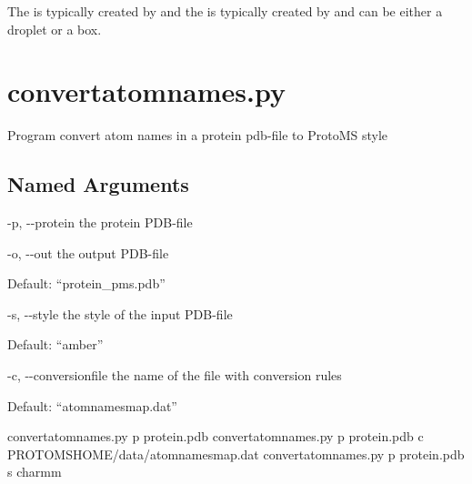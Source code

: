 \documentclass[letterpaper,10pt,english]{sphinxmanual}
\begin{document}
The  is typically created by  and the  is typically created by  and can be either a droplet or a box.


\section{convertatomnames.py}
\label{\detokenize{tools:convertatomnames-py}}

Program convert atom names in a protein pdb-file to ProtoMS style


%
\begin{sphinxVerbatim}[commandchars=\\\{\}]
  \PYG{p}{[}\PYG{p}{]} \PYG{p}{[} \PYG{p}{]} \PYG{p}{[} \PYG{p}{]} \PYG{p}{[} \PYG{p}{]}
                           \PYG{p}{[} \PYG{p}{]}
\end{sphinxVerbatim}


\subsection{Named Arguments}
\label{\detokenize{tools:Named Arguments}}\begin{optionlist}{3cm}
\item [-p, -{-}protein]  
the protein PDB-file
\item [-o, -{-}out]  
the output PDB-file

Default: “protein\_pms.pdb”
\item [-s, -{-}style]  
the style of the input PDB-file

Default: “amber”
\item [-c, -{-}conversionfile]  
the name of the file with conversion rules

Default: “atomnamesmap.dat”
\end{optionlist}


%
\begin{sphinxVerbatim}[commandchars=\\\{\}]
convertatomnames.py \PYGZhy{}p protein.pdb
convertatomnames.py \PYGZhy{}p protein.pdb \PYGZhy{}c \PYGZdl{}PROTOMSHOME/data/atomnamesmap.dat
convertatomnames.py \PYGZhy{}p protein.pdb \PYGZhy{}s charmm
\end{sphinxVerbatim}
\end{document}
